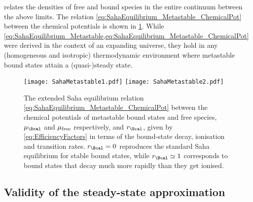 \documentclass[preprint,5p,twocolumn]{elsarticle}
\begin{document}
%
 relates the densities of free and bound species in the entire continuum between the above %
limits. The relation \eqref{eq:SahaEquilibrium_Metastable_ChemicalPot} between the chemical potentials is shown in \cref{fig:SahaMetastable}. 
While \cref{eq:SahaEquilibrium_Metastable,eq:SahaEquilibrium_Metastable_ChemicalPot} were derived in the context of an expanding universe, they
hold in any (homogeneous and isotropic) thermodynamic environment where metastable bound states attain a (quasi-)steady state.



\begin{figure}[t!]
\centering
\texttt{[image: SahaMetastable1.pdf]}
\texttt{[image: SahaMetastable2.pdf]}
\caption{The extended Saha equilibrium relation \eqref{eq:SahaEquilibrium_Metastable_ChemicalPot} between the chemical potentials of metastable bound states and free species, $\mu_{\Bcal}$ and $\mu_{\rm free}$ respectively, and $r_{\Bcal}$, given by \cref{eq:EfficiencyFactors} in terms of the bound-state decay, ionisation and transition rates. $r_{\Bcal}=0$ 
reproduces the standard Saha equilibrium for stable bound states, while $r_{\Bcal} \simeq 1$ corresponds to bound states that decay much more rapidly than they get ionised.}
\label{fig:SahaMetastable}
\end{figure}




\subsection{Validity of the steady-state approximation \label{sec:BoltzmannEqs_ValidityApprox}}
\end{document}
